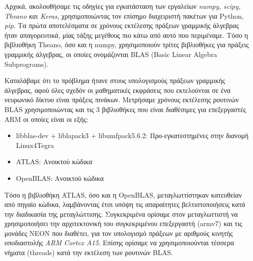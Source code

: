 Αρχικά, ακολουθήσαμε τις οδηγίες για εγκατάσταση των εργαλείων \emph{numpy, scipy, Theano και Keras},
χρησιμοποιώντας τον επίσημο διαχειριστή πακέτων για Python, \emph{pip}.
Τα πρώτα αποτελέσματα σε χρόνους εκτέλεσης πράξεων γραμμικής άλγεβρας ήταν
απαγορευτικά, μίας τάξης μεγέθους πιο κάτω από αυτό που περιμέναμε.
Τόσο η βιβλιοθήκη Theano, όσο και η numpy, χρησιμοποιούν τρίτες βιβλιοθήκες
για πράξεις γραμμικής άλγεβρας, οι οποίες ονομάζονται BLAS (Basic Linear Algebra Subprograms).

Καταλάβαμε ότι το πρόβλημα ήτανε στους υπολογισμούς πράξεων γραμμικής άλγεβρας,
αφού όλες σχεδόν οι μαθηματικές εκφράσεις που εκτελούνται σε ένα
νευρωνικό δίκτυο είναι πράξεις πινάκων. Μετρήσαμε χρόνους εκτέλεσης
ρουτινών BLAS χρησιμοποιώντας και τις 3 βιβλιοθήκες που είναι διαθέσιμες για
επεξεργαστές ARM οι οποίες είναι οι εξής:
\begin{itemize}
  \item{libblas-dev + liblapack3 + libumfpack5.6.2: Προ-εγκατεστημένες στην διανομή Linux4Tegra}
  \item{ATLAS: Ανοικτού κώδικα}
  \item{OpenBLAS: Ανοικτού κώδικα}
\end{itemize}

Τόσο η βιβλιοθήκη ATLAS, όσο και η OpenBLAS, μεταγλωττίστηκαν κατευθείαν από πηγαίο κώδικα,
λαμβάνοντας έτσι υπόψη τις απαραίτητες βελτιστοποιήσεις κατά την διαδικασία
της μεταγλώττισης. Συγκεκριμένα ορίσαμε στον μεταγλωττιστή να χρησιμοποιήσει την αρχιτεκτονική του
συγκεκριμένου επεξεργαστή (armv7) και τις μονάδες
NEON που διαθέτει, για τον υπολογισμό πράξεων με αριθμούς κινητής
υποδιαστολής \emph{ARM Cortex A15}. Επίσης ορίσαμε να χρησιμοποιούνται
τέσσερα νήματα (threads) κατά την εκτέλεση των ρουτινών BLAS.

